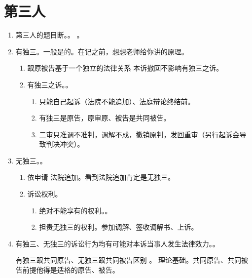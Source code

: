 \section{第三人}
\begin{enumerate}
  \item 第三人的题目断。。
        。
  \item 有独三。一般是的。在记之前，想想老师给你讲的原理。
        \begin{enumerate}
          \item 跟原被告基于一个独立的法律关系 \yjt 本诉撤回不影响有独三之诉。
          \item 有独三之诉。。
                \begin{enumerate}
                  \item 只能自己起诉（法院不能追加）、法庭辩论终结前。
                  \item 有独三是原告，原审原、被告是共同被告。
                  \item 二审只准调不准判，调解不成，撤销原判，发回重审（另行起诉会导致判决冲突）。
                \end{enumerate}
        \end{enumerate}
  \item 无独三。。
        \begin{enumerate}
          \item 依申请 \hz 法院追加。看到法院追加肯定是无独三。
          \item 诉讼权利。
                \begin{enumerate}
                  \item 绝对不能享有的权利。。
                  \item 担责无独三的权利。参加调解、签收调解书、上诉。
                \end{enumerate}
        \end{enumerate}
  \item 有独三、无独三的诉讼行为均有可能对本诉当事人发生法律效力。。
        \begin{kk}{有独三跟共同原告、无独三跟共同被告区别}
          。
          理论基础。共同原告、共同被告前提他得是适格的原告、被告。
          \tcblower
        \end{kk}
\end{enumerate}

